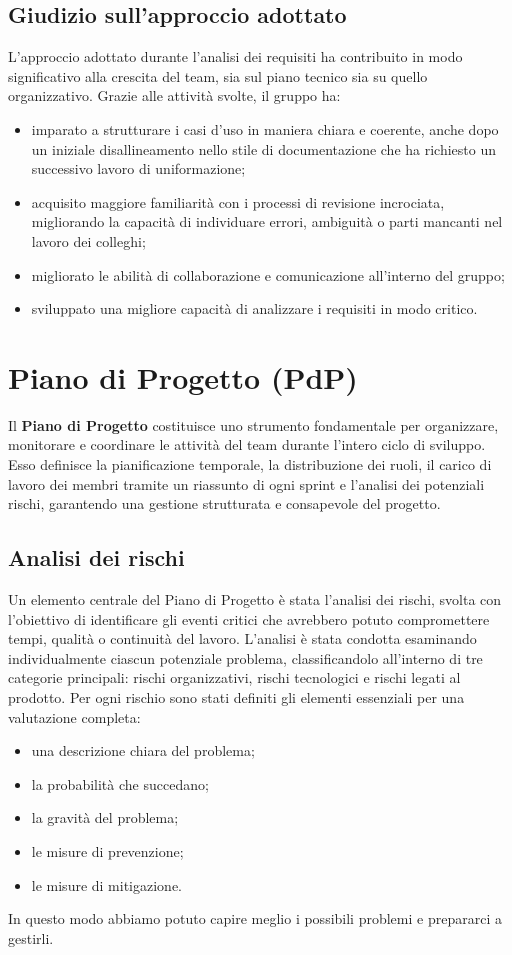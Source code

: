 \documentclass[11pt,a4paper]{article}
\begin{document}
\subsection{Giudizio sull'approccio adottato}
L’approccio adottato durante l’analisi dei requisiti ha contribuito in modo significativo alla crescita del team, sia sul piano tecnico sia su quello organizzativo. Grazie alle attività svolte, il gruppo ha:
\begin{itemize}
\item imparato a strutturare i casi d’uso in maniera chiara e coerente, anche dopo un iniziale disallineamento nello stile di documentazione che ha richiesto un successivo lavoro di uniformazione;
\item acquisito maggiore familiarità con i processi di revisione incrociata, migliorando la capacità di individuare errori, ambiguità o parti mancanti nel lavoro dei colleghi;
\item migliorato le abilità di collaborazione e comunicazione all'interno del gruppo;
\item sviluppato una migliore capacità di analizzare i requisiti in modo critico.
\end{itemize}

\newpage

\section{Piano di Progetto (PdP)}
Il \textbf{Piano di Progetto} costituisce uno strumento fondamentale per organizzare, monitorare e coordinare le attività del team durante l’intero ciclo di sviluppo. Esso definisce la pianificazione temporale, la distribuzione dei ruoli, il carico di lavoro dei membri tramite un riassunto di ogni sprint e l’analisi dei potenziali rischi, garantendo una gestione strutturata e consapevole del progetto.

\subsection{Analisi dei rischi}
Un elemento centrale del Piano di Progetto è stata l’analisi dei rischi, svolta con l’obiettivo di identificare gli eventi critici che avrebbero potuto compromettere tempi, qualità o continuità del lavoro.
L’analisi è stata condotta esaminando individualmente ciascun potenziale problema, classificandolo all’interno di tre categorie principali: rischi organizzativi, rischi tecnologici e rischi legati al prodotto.
Per ogni rischio sono stati definiti gli elementi essenziali per una valutazione completa:
\begin{itemize}
\item una descrizione chiara del problema;
\item la probabilità che succedano;
\item la gravità del problema;
\item le misure di prevenzione;
\item le misure di mitigazione.
\end{itemize}
In questo modo abbiamo potuto capire meglio i possibili problemi e prepararci a gestirli.
\end{document}
